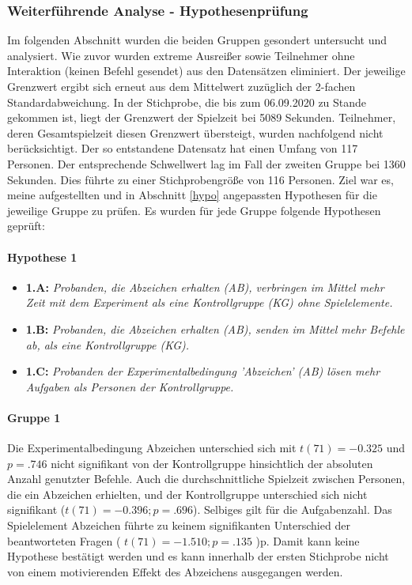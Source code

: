 \subsubsection{Weiterführende Analyse - Hypothesenprüfung}


Im folgenden Abschnitt wurden die beiden Gruppen gesondert untersucht und analysiert. Wie zuvor wurden extreme Ausreißer sowie Teilnehmer ohne Interaktion (keinen Befehl gesendet) aus den Datensätzen eliminiert. Der jeweilige Grenzwert ergibt sich erneut aus dem Mittelwert zuzüglich der 2-fachen Standardabweichung. In der Stichprobe, die bis zum 06.09.2020 zu Stande gekommen ist, liegt der Grenzwert der Spielzeit bei 5089 Sekunden. Teilnehmer, deren Gesamtspielzeit diesen Grenzwert übersteigt, wurden nachfolgend nicht berücksichtigt. Der so entstandene Datensatz hat einen Umfang von 117 Personen. Der entsprechende Schwellwert lag im Fall der zweiten Gruppe bei 1360 Sekunden. Dies führte zu einer Stichprobengröße von 116 Personen. Ziel war es, meine aufgestellten und in Abschnitt \ref{hypo} angepassten Hypothesen für die jeweilige Gruppe zu prüfen. Es wurden für jede Gruppe folgende Hypothesen geprüft:

\paragraph{Hypothese 1}
\begin{itemize}
    \item \textbf{1.A:} \textit{Probanden, die Abzeichen erhalten (AB), verbringen im Mittel mehr Zeit mit dem Experiment als eine Kontrollgruppe (KG) ohne Spielelemente.}
    \item \textbf{1.B:} \textit{Probanden, die Abzeichen erhalten (AB), senden im Mittel mehr Befehle ab, als eine Kontrollgruppe (KG).}
    \item \textbf{1.C:} \textit{Probanden der Experimentalbedingung 'Abzeichen' (AB) lösen mehr Aufgaben als Personen der Kontrollgruppe.} 
\end{itemize}

\paragraph{Gruppe 1}
Die Experimentalbedingung Abzeichen unterschied sich mit $ t(71)=-0.325 $ und $p=.746$ nicht signifikant von der Kontrollgruppe hinsichtlich der absoluten Anzahl genutzter Befehle. Auch die durchschnittliche Spielzeit zwischen Personen, die ein Abzeichen erhielten, und der Kontrollgruppe unterschied sich nicht signifikant ($t(71)=-0.396; p=.696$). Selbiges gilt für die Aufgabenzahl. Das Spielelement Abzeichen führte zu keinem signifikanten Unterschied der beantworteten Fragen ( $ t(71)=-1.510; p=.135 $ )p. Damit kann keine Hypothese bestätigt werden und es kann innerhalb der ersten Stichprobe nicht von einem motivierenden Effekt des Abzeichens ausgegangen werden.

